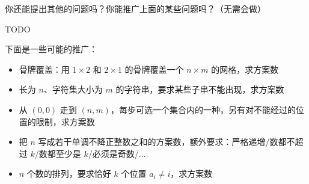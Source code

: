 \begin{remark}
    你还能提出其他的问题吗？你能推广上面的某些问题吗？（无需会做）
\end{remark}

\begin{solution}
    TODO
\end{solution}

\begin{remark}
    下面是一些可能的推广：
\begin{itemize}
    \item 骨牌覆盖：用 $1\times 2$ 和 $2\times 1$ 的骨牌覆盖一个 $n\times m$ 的网格，求方案数
    \item 长为 $n$、字符集大小为 $m$ 的字符串，要求某些子串不能出现，求方案数
    \item 从 $(0,0)$ 走到 $(n,m)$，每步可选一个集合内的一种，另有对不能经过的位置的限制，求方案数
    \item 把 $n$ 写成若干单调不降正整数之和的方案数，额外要求：严格递增/数都不超过 $k$/数都至少是 $k$/必须是奇数/...
    \item $n$ 个数的排列，要求恰好 $k$ 个位置 $a_i\ne i$，求方案数
\end{itemize}
\end{remark}

